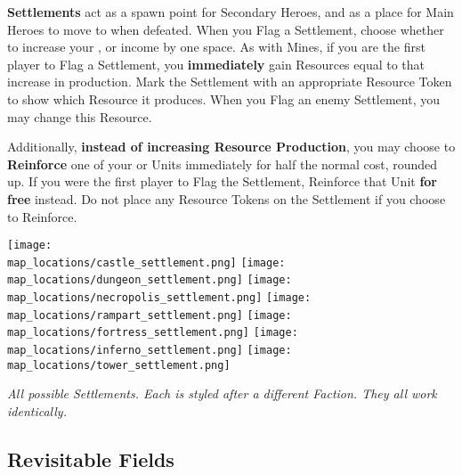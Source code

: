 \begin{multicols*}{2}
\textbf{Settlements} act as a spawn point for Secondary Heroes, and as a place for Main Heroes to move to when defeated.
When you Flag a Settlement, choose whether to increase your ,  or  income by one space.
As with Mines, if you are the first player to Flag a Settlement, you \textbf{immediately} gain Resources equal to that increase in production.
Mark the Settlement with an appropriate Resource Token to show which Resource it produces.
When you Flag an enemy Settlement, you may change this Resource.\par
Additionally, \textbf{instead of increasing Resource Production}, you may choose to \textbf{Reinforce} one of your  or  Units immediately for half the normal cost, rounded up.
If you were the first player to Flag the Settlement, Reinforce that Unit \textbf{for free} instead.
Do not place any Resource Tokens on the Settlement if you choose to Reinforce.

\bigbreak

\begin{minipage}[h]{\linewidth}
  \centering
  \texttt{[image: \\map\_locations/castle\_settlement.png]}
  \texttt{[image: \\map\_locations/dungeon\_settlement.png]}
  \texttt{[image: \\map\_locations/necropolis\_settlement.png]}
  \texttt{[image: \\map\_locations/rampart\_settlement.png]}
  \texttt{[image: \\map\_locations/fortress\_settlement.png]}
  \texttt{[image: \\map\_locations/inferno\_settlement.png]}
  \texttt{[image: \\map\_locations/tower\_settlement.png]}
  \par
  \textit{All possible Settlements.
  Each is styled after a different Faction.
  They all work identically.}
\end{minipage}
\end{multicols*}
\bigbreak

\subsection*{\hypertarget{Revisitable Fields}{Revisitable Fields}}

